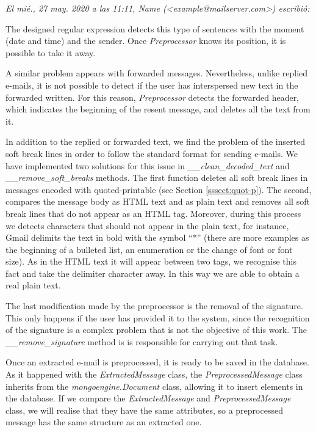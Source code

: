 \textit{El mié., 27 may. 2020 a las 11:11, Name (<example@mailserver.com>) escribió:}

The designed regular expression detects this type of sentences with the moment (date and time) and the sender. Once \textit{Preprocessor} knows its position, it is possible to take it away.

A similar problem appears with forwarded messages. Nevertheless, unlike replied e-mails, it is not possible to detect if the user has interspersed new text in the forwarded written. For this reason, \textit{Preprocessor} detects the forwarded header, which indicates the beginning of the resent message, and deletes all the text from it.

In addition to the replied or forwarded text, we find the problem of the inserted soft break lines in order to follow the standard format for sending e-mails. We have implemented two solutions for this issue in \textit{\_\_clean\_decoded\_text} and \textit{\_\_remove\_soft\_breaks} methods. The first function deletes all soft break lines in messages encoded with quoted-printable (see Section \ref{sssect:quot-p}). The second, compares the message body as HTML text and as plain text and removes all soft break lines that do not appear as an HTML tag. Moreover, during this process we detects characters that should not appear in the plain text, for instance, Gmail delimits the text in bold with the symbol ``*'' (there are more examples as the beginning of a bulleted list, an enumeration or the change of font or font size). As in the HTML text it will appear between two tags, we recognise this fact and take the delimiter character away. In this way we are able to obtain a real plain text.

The last modification made by the preprocessor is the removal of the signature. This only happens if the user has provided it to the system, since the recognition of the signature is a complex problem that is not the objective of this work. The \textit{\_\_remove\_signature} method is is responsible for carrying out that task.

Once an extracted e-mail is preprocessed, it is ready to be saved in the database. As it happened with the \textit{ExtractedMessage} class, the \textit{PreprocessedMessage} class inherits from the \textit{mongoengine.Document} class, allowing it to insert elements in the database. If we compare the \textit{ExtractedMessage} and \textit{PreprocessedMessage} class, we will realise that they have the same attributes, so a preprocessed message has the same structure as an extracted one.